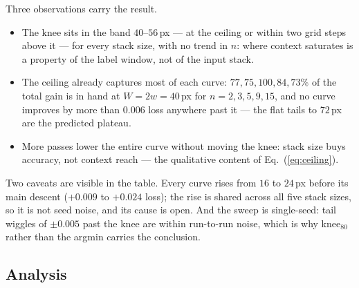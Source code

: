 Three observations carry the result.
\begin{itemize}
  \item The knee sits in the band $40$--$56$\,px --- at the ceiling or within two grid steps above it --- for every stack size, with no trend in $n$: where context saturates is a property of the label window, not of the input stack.
  \item The ceiling already captures most of each curve: $77, 75, 100, 84, 73\%$ of the total gain is in hand at $W = 2w = 40$\,px for $n = 2, 3, 5, 9, 15$, and no curve improves by more than $0.006$ loss anywhere past it --- the flat tails to $72$\,px are the predicted plateau.
  \item More passes lower the entire curve without moving the knee: stack size buys accuracy, not context reach --- the qualitative content of Eq.~(\ref{eq:ceiling}).
\end{itemize}

Two caveats are visible in the table. Every curve rises from $16$ to $24$\,px before its main descent ($+0.009$ to $+0.024$ loss); the rise is shared across all five stack sizes, so it is not seed noise, and its cause is open. And the sweep is single-seed: tail wiggles of $\pm 0.005$ past the knee are within run-to-run noise, which is why knee$_{80}$ rather than the argmin carries the conclusion. 

\subsection{Analysis}
\label{sec:experiments_analysis}

